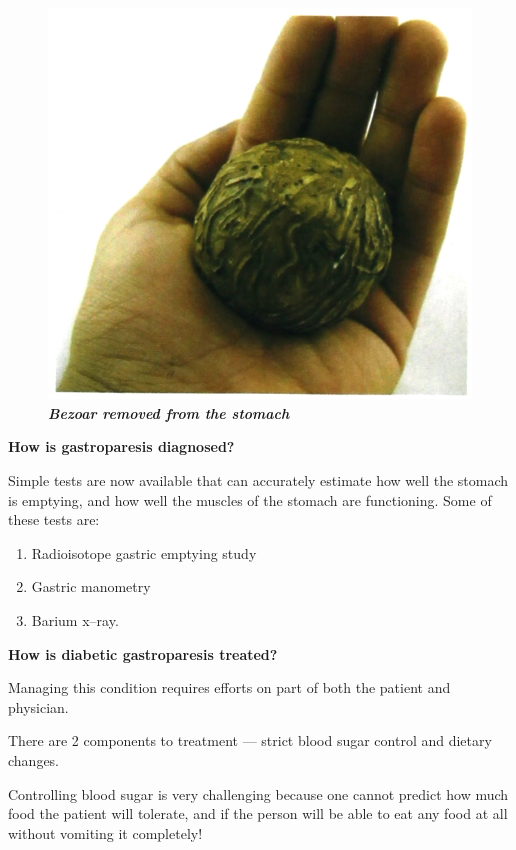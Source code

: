 \begin{figure}
\centering
\includegraphics[scale=1.2]{images/077.jpg}\\
\textbf{\textit{Bezoar removed from the stomach}}
\end{figure}

\noindent\textbf{How is gastroparesis diagnosed?}

Simple tests are now available that can accurately estimate how well the stomach is emptying, and how well the muscles of the stomach are functio\-ning. Some of these tests are:
\begin{enumerate}[•]
\itemsep=0pt
\item Radioisotope gastric emptying study
\item Gastric manometry
\item Barium x–ray.
\end{enumerate}

\clearpage

\noindent\textbf{How is diabetic gastroparesis treated?}

Managing this condition requires efforts on part of both the patient and physician.

There are 2 components to treatment — strict blood sugar control and dietary changes.

Controlling blood sugar is very challenging because one cannot predict how much food the patient will tolerate, and if the person will be able to eat any food at all without vomiting it completely!

